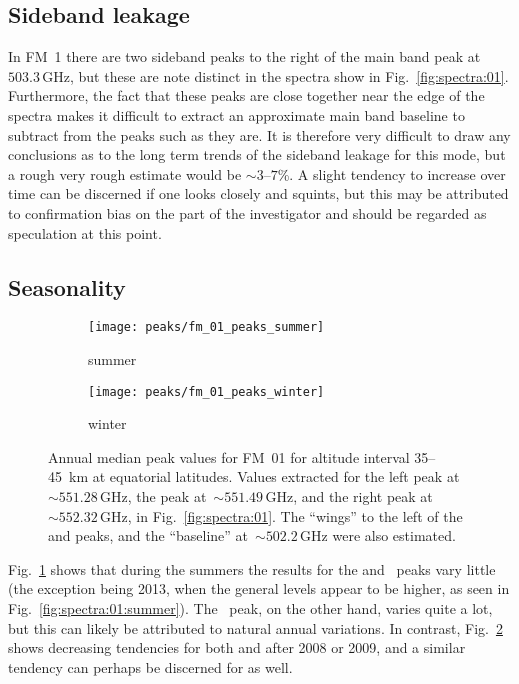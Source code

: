 \subsection{Sideband leakage}
\label{FM01:sbl}
In FM~1 there are two sideband peaks to the right of the main band peak at
$503.3\,\mathrm{GHz}$, but these are note distinct in the spectra show in
Fig.~\ref{fig:spectra:01}.  Furthermore, the fact that these peaks are close
together near the edge of the spectra makes it difficult to extract an
approximate main band baseline to subtract from the peaks such as they are.  It
is therefore very difficult to draw any conclusions as to the long term trends
of the sideband leakage for this mode, but a rough very rough estimate would be
$\sim3$--$7$\%.  A slight tendency to increase over time can be discerned if
one looks closely and squints, but this may be attributed to confirmation bias
on the part of the investigator and should be regarded as speculation at this
point.


\subsection{Seasonality}
\label{FM01:seasonality}

\begin{figure}[ht]
    \centering
    \begin{subfigure}[b]{0.9545\textwidth}
        \texttt{[image: peaks/fm\_01\_peaks\_summer]}
        \caption{summer}\label{fig:peaks:01:summer}
    \end{subfigure}
    \begin{subfigure}[b]{0.9545\textwidth}
        \texttt{[image: peaks/fm\_01\_peaks\_winter]}
        \caption{winter}\label{fig:peaks:01:winter}
    \end{subfigure}
    \caption{Annual median peak values for FM~01 for altitude interval
        35--45~km at equatorial latitudes.  Values extracted for the left
         peak at~$\sim551.28\,\mathrm{GHz}$, the  peak
        at~$\sim551.49\,\mathrm{GHz}$, and the right  peak
        at~$\sim552.32\,\mathrm{GHz}$, in Fig.~\ref{fig:spectra:01}.  The
        ``wings'' to the left of the  and  peaks, and the
        ``baseline'' at~$\sim502.2\,\mathrm{GHz}$ were also estimated.
        }\label{fig:peaks:01}
\end{figure}

\noindent
Fig.~\ref{fig:peaks:01:summer} shows that during the summers the results for
the  and ~peaks vary little (the exception being 2013,
when the general levels appear to be higher, as seen in
Fig.~\ref{fig:spectra:01:summer}).  The ~peak, on the other hand,
varies quite a lot, but this can likely be attributed to natural annual
variations.  In contrast, Fig.~\ref{fig:peaks:01:winter} shows decreasing
tendencies for both  and  after 2008 or 2009, and a
similar tendency can perhaps be discerned for  as well.

